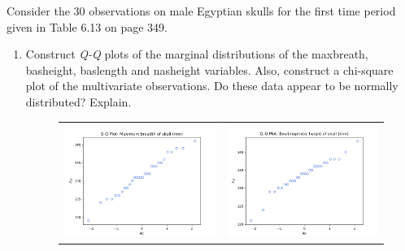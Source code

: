 Consider the 30 observations on male Egyptian skulls for the first time period given in Table 6.13 on page 349.

\begin{enumerate}[label= (\alph*)]
    \item Construct \textit{Q-Q} plots of the marginal distributions of the maxbreath, basheight,
    baslength and nasheight variables. Also, construct a chi-square plot of the
    multivariate observations. Do these data appear to be normally distributed?
    Explain.

    \begin{figure}[H]
        \centering
        \begin{tabular}{cc}
            \includegraphics[scale=0.30]{./python/chapter-5/Question-5-23-a-QQ-MaxBreath.png} &
            \includegraphics[scale=0.30]{./python/chapter-5/Question-5-23-a-QQ-BasHeight.png} \\

\end{tabular}
\end{figure}
\end{enumerate}
